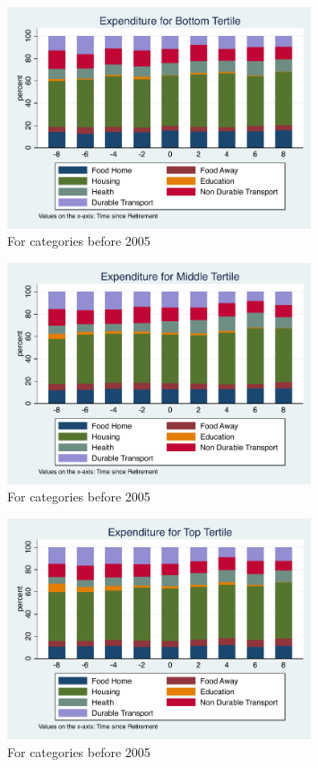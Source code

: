 \documentclass[11pt,onecolumn]{article}
\numberwithin{figure}{section}
\begin{document}
\begin{figure}[h]
	\caption{For categories before 2005}
	\centering
	\includegraphics[width=0.8\textwidth]{../ConsumptionPostRetirement/Tertile_Bar/tertile1.pdf}
\end{figure}

\begin{figure}[h]
	\caption{For categories before 2005}
	\centering
	\includegraphics[width=0.8\textwidth]{../ConsumptionPostRetirement/Tertile_Bar/tertile2.pdf}
\end{figure}

\begin{figure}[h]
	\caption{For categories before 2005}
	\centering
	\includegraphics[width=0.8\textwidth]{../ConsumptionPostRetirement/Tertile_Bar/tertile3.pdf}
\end{figure}
\end{document}
